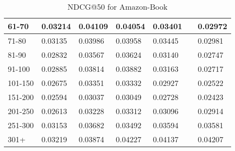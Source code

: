 \begin{table*}[]
\begin{tabular}{|l|l|l|l|l|l|l|}
        61-70   & 0.03214                        & 0.04109                        & 0.04054                        & 0.03401                        &                                & 0.02972                               \\ \hline
        71-80   & 0.03135                        & 0.03986                        & 0.03958                        & 0.03445                        &                                & 0.02981                               \\ \hline
        81-90   & 0.02832                        & 0.03567                        & 0.03624                        & 0.03140                        &                                & 0.02747                               \\ \hline
        91-100  & 0.02885                        & 0.03814                        & 0.03882                        & 0.03163                        &                                & 0.02717                               \\ \hline
        101-150 & 0.02675                        & 0.03351                        & 0.03332                        & 0.02927                        &                                & 0.02522                               \\ \hline
        151-200 & 0.02594                        & 0.03037                        & 0.03049                        & 0.02728                        &                                & 0.02423                               \\ \hline
        201-250 & 0.02613                        & 0.03228                        & 0.03312                        & 0.03096                        &                                & 0.02914                               \\ \hline
        251-300 & 0.03153                        & 0.03682                        & 0.03492                        & 0.03594                        &                                & 0.03581                               \\ \hline
        301+    & 0.03219                        & 0.03874                        & 0.04227                        & 0.04137                        &                                & 0.04207                               \\ \hline
    \end{tabular}
    \caption{NDCG@50 for Amazon-Book}
\end{table*}

